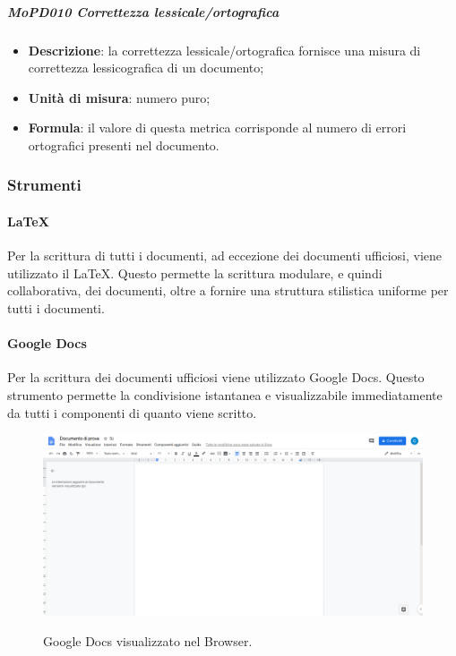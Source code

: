 \documentclass[../norme-di-progetto.tex]{subfiles}
\begin{document}
\subparagraph{MoPD010 Correttezza lessicale/ortografica}
\begin{itemize}
  \item \textbf{Descrizione}: la correttezza lessicale/ortografica fornisce una misura di correttezza lessicografica di un documento;
  \item \textbf{Unità di misura}: numero puro;
  \item \textbf{Formula}: il valore di questa metrica corrisponde al numero di errori ortografici presenti nel documento.
\end{itemize}

\subsubsection{Strumenti}
\paragraph{\LaTeX}
Per la scrittura di tutti i documenti, ad eccezione dei documenti ufficiosi, viene utilizzato il  \LaTeX. Questo permette la scrittura modulare, e quindi collaborativa, dei documenti, oltre a fornire una struttura stilistica uniforme per tutti i documenti.
\paragraph{Google Docs}
Per la scrittura dei documenti ufficiosi viene utilizzato Google Docs. Questo strumento permette la condivisione istantanea e visualizzabile immediatamente da tutti i componenti di quanto viene scritto.

\begin{figure}[H]
  \centering
  \includegraphics[width=15cm]{img/docs.png}
  \label{fig:github}
  \caption{Google Docs visualizzato nel Browser.}
\end{figure}
\end{document}
